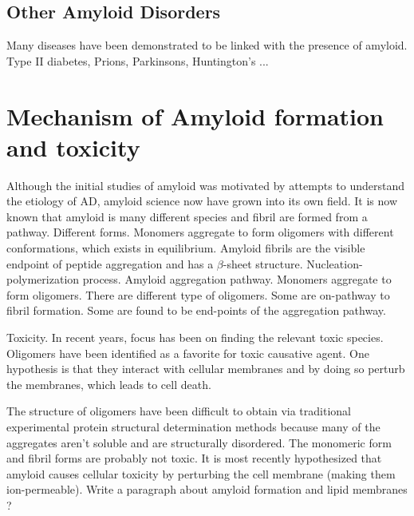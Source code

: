 \subsection{Other Amyloid Disorders}
Many diseases have been demonstrated to be linked with the presence of amyloid. Type II diabetes, Prions, Parkinsons, Huntington's ... 

\section{Mechanism of Amyloid formation and toxicity}
\begin{outline}[enumerate]
\1 Although the initial studies of amyloid was motivated by attempts to understand the etiology of AD, amyloid science now have grown into its own field.
  \2 It is now known that amyloid is many different species and fibril are formed from a pathway. Different forms. Monomers aggregate to form oligomers with different conformations, which exists in equilibrium.  Amyloid fibrils are the visible endpoint of peptide aggregation and has a $\beta$-sheet structure.
  \2 Nucleation-polymerization process. Amyloid aggregation pathway. Monomers aggregate to form oligomers. There are different type of oligomers. Some are on-pathway to fibril formation. Some are found to be end-points of the aggregation pathway. 

\1 Toxicity. In recent years, focus has been on finding the relevant toxic species. Oligomers have been identified as a favorite for toxic causative agent.  One hypothesis is that they interact with cellular membranes and by doing so perturb the membranes, which leads to cell death.

\1 The structure of oligomers have been difficult to obtain via traditional experimental protein structural determination methods because many of the aggregates aren't soluble and are structurally disordered.   
  \2 The monomeric form and fibril forms are probably not toxic. It is most recently hypothesized that amyloid causes cellular toxicity by perturbing the cell membrane (making them ion-permeable).
  \2 Write a paragraph about amyloid formation and lipid membranes ?
\end{outline}


